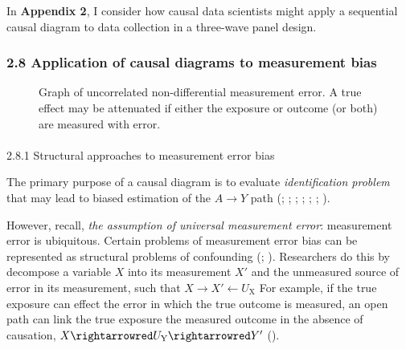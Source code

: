\documentclass[
  singlecolumn]{article}
\makeatletter
\let\oldparagraph\paragraph
\renewcommand{\paragraph}{
    \@ifstar
      \xxxParagraphStar
      \xxxParagraphNoStar
  }
\newcommand{\xxxParagraphStar}[1]{\oldparagraph*{#1}\mbox{}}
\newcommand{\xxxParagraphNoStar}[1]{\oldparagraph{#1}\mbox{}}
\makeatother
\begin{document}
In \textbf{Appendix 2}, I consider how causal data scientists might
apply a sequential causal diagram to data collection in a three-wave
panel design.

\subsubsection{2.8 Application of causal diagrams to measurement
bias}\label{application-of-causal-diagrams-to-measurement-bias}

\begin{figure}


\caption{\label{fig-measure-error}Graph of uncorrelated non-differential
measurement error. A true effect may be attenuated if either the
exposure or outcome (or both) are measured with error.}

\end{figure}%

\paragraph{2.8.1 Structural approaches to measurement error
bias}\label{structural-approaches-to-measurement-error-bias}

The primary purpose of a causal diagram is to evaluate
\emph{identification problem} that may lead to biased estimation of the
\(A \to Y\) path (; ;
;
;
; ; ).

However, recall, \emph{the assumption of universal measurement error}:
measurement error is ubiquitous. Certain problems of measurement error
bias can be represented as structural problems of confounding
(;
).
Researchers do this by decompose a variable \(X\) into its measurement
\(X'\) and the unmeasured source of error in its measurement, such that
\(X \to X' \leftarrow U_{\text{X}}\) For example, if the true exposure
can effect the error in which the true outcome is measured, an open path
can link the true exposure the measured outcome in the absence of
causation, \(X\rightarrowred U_{\text{Y}} \rightarrowred Y'\)
().
\end{document}

